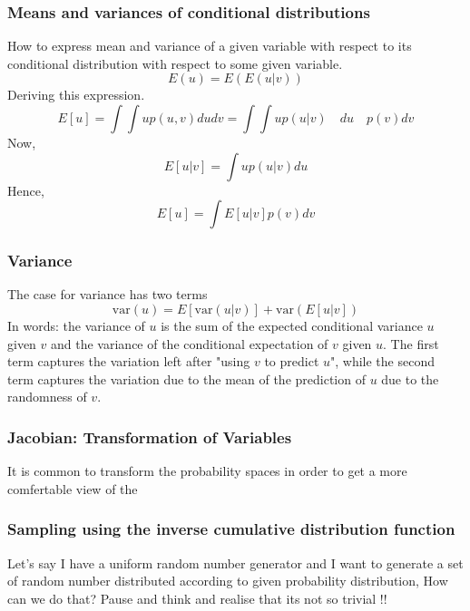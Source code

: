 \documentclass{article}
\begin{document}
\subsubsection*{Means and variances of conditional distributions}
How to express mean and variance of a given variable with respect to its conditional distribution with respect to some given variable.
$$E(u) = E(E(u|v))$$
Deriving this expression.
$$E[u] = \int\int up(u,v)dudv =  \int\int up(u|v) \quad du\quad p(v)dv $$
Now,
$$E[u|v] = \int up(u|v)du $$
Hence,
$$E[u] = \int E[u|v]p(v)dv $$

\subsubsection*{Variance}
The case for variance has two terms 
$$\text{var}(u) = E[\text{var}(u|v)] + \text{var}(E[u|v])$$
In words: the variance of $u$ is the sum of the expected conditional variance $u$ given $v$ and the variance of the conditional expectation of $v$ given $u$. The first term captures the variation left after "using $v$ to predict $u$", while the second term captures the variation due to the mean of the prediction of $u$ due to the randomness of $v$.
\subsubsection*{Jacobian: Transformation of Variables}
It is common to transform the probability spaces in order to get a more comfertable view of the
\subsubsection*{Sampling using the inverse cumulative distribution function}
Let's say I have a uniform random number generator and I want to generate a set of random number distributed according to given probability distribution, How can we do that? Pause and think and realise that its not so trivial !!
\end{document}
